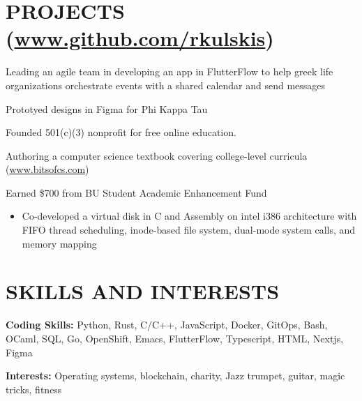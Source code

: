 \documentclass[10pt]{article}
\begin{document}
\begin{FlushLeft}
  \section{PROJECTS (\href{www.github.com/rkulskis}{www.github.com/rkulskis})}
  \begin{itemize}{
    \item Leading an agile team in developing an app in FlutterFlow to help greek life organizations orchestrate events with a shared calendar and send messages
    \item Prototyed designs in Figma for Phi Kappa Tau
  }
  \end{itemize}
  \begin{itemize}{
    \item Founded 501(c)(3) nonprofit for free online education.
    \item Authoring a computer science textbook covering college-level curricula (\href{www.bitsofcs.com}{www.bitsofcs.com})
    \item Earned \$700 from BU Student Academic Enhancement Fund
    }
  \end{itemize}

  \begin{itemize}
  \item Co-developed a virtual disk in C and Assembly on intel i386 architecture with FIFO thread scheduling, inode-based file system, dual-mode system calls, and memory mapping
  \end{itemize}
  
  \section{SKILLS AND INTERESTS}
  \vspace{-0.75em}
  \begin{itemize}{
    \item {\bf Coding Skills:} Python, Rust, C/C++, JavaScript, Docker, GitOps, Bash, OCaml, SQL, Go, OpenShift, Emacs, FlutterFlow, Typescript, HTML, Nextjs, Figma
    \item {\bf Interests:} Operating systems, blockchain, charity, Jazz trumpet, guitar, magic tricks, fitness
    }
  \end{itemize}


\end{FlushLeft}
\end{document}
